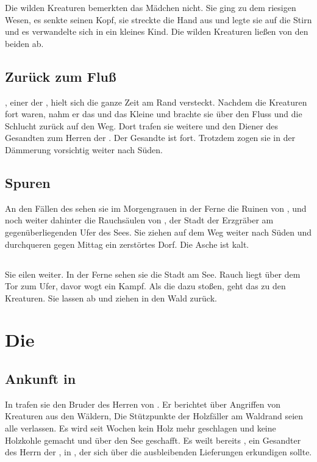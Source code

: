 \begin{huge}
Die wilden Kreaturen bemerkten das Mädchen nicht. Sie ging zu dem riesigen Wesen, es senkte seinen Kopf, sie streckte die Hand aus und legte sie auf die Stirn und es verwandelte sich in ein kleines Kind. Die wilden Kreaturen ließen von den beiden ab.

\section{Zurück zum Fluß}
\Nox, einer der \Schattenjager, hielt sich die ganze Zeit am Rand versteckt. Nachdem die Kreaturen fort waren, nahm er das \Sturmkind und das Kleine und brachte sie über den Fluss und die Schlucht zurück auf den Weg. Dort trafen sie weitere \Schattenjager und den Diener des Gesandten zum Herren der \Eisenmeister. Der Gesandte ist fort. Trotzdem zogen sie in der Dämmerung vorsichtig weiter nach Süden.

\section{Spuren}
An den Fällen des \Dreifluss sehen sie im Morgengrauen in der Ferne die Ruinen von \Darmon, und noch weiter dahinter die Rauchsäulen von \Dariom, der Stadt der Erzgräber am gegenüberliegenden Ufer des Sees. Sie ziehen auf dem Weg weiter nach Süden und durchqueren gegen Mittag ein zerstörtes Dorf. Die Asche ist kalt.

\section{\Braucheln}
Sie eilen weiter. In der Ferne sehen sie die Stadt \Braucheln am See. Rauch liegt über dem Tor zum Ufer, davor wogt ein Kampf. Als die \Schattenjager dazu stoßen, geht das \Sturmkind zu den Kreaturen. Sie lassen ab und ziehen in den Wald zurück.

\chapter{Die \Eisenmeister}
\section{Ankunft in \Braucheln}
In \Braucheln trafen sie den Bruder des Herren von \Rhingell. Er berichtet über Angriffen von Kreaturen aus den Wäldern, Die Stützpunkte der Holzfäller am Waldrand seien alle verlassen. Es wird seit Wochen kein Holz mehr geschlagen und keine Holzkohle gemacht und über den See geschafft. Es weilt bereits \Safir, ein Gesandter des Herrn der \Eisenmeister, in \Braucheln, der sich über die ausbleibenden Lieferungen erkundigen sollte.


\end{huge}
